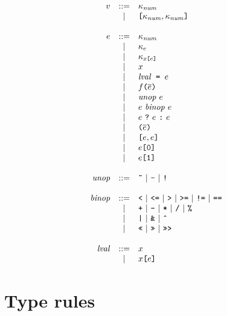 \documentclass{article}
\newcommand{\ternary}[3]{{#1}\ \mathjs{?}\ {#2}\ \mathjs{:}\ {#3}}
\newcommand{\funcall}[2]{{#1}\mathjs{(}{#2}\mathjs{)}}
\newcommand{\paren}[1]{\mathjs{(}{#1}\mathjs{)}}
\newcommand{\seq}[1]{\overline{{#1}}}
\newcommand{\mathjs}[1]{\mbox{\texttt{{#1}}}}
\newcommand{\mathjssm}[1]{\mbox{\texttt{\scriptsize {#1}}}}
\newcommand{\getprop}[2]{{#1}\mathjs{[}{#2}\mathjs{]}}
\newcommand{\getpropsm}[2]{{#1}\mathjssm{[}{#2}\mathjssm{]}}
\newcommand{\longlong}[2]{\mathjs{[}{#1},{#2}\mathjs{]}}
\begin{document}
\[
\begin{array}{rcl}
v & ::= & \kappa_{\mathit{num}} \\
  &  |  & \longlong{\kappa_{\mathit{num}}}{\kappa_{\mathit{num}}} \\
\\
e & ::= & \kappa_{\mathit{num}} \\
  &  |  & \kappa_e \\
  &  |  & \kappa_{\getpropsm{x}{e}} \\
  &  |  & x \\
  &  |  & \mathit{lval}\mathjs{ = }e \\
  &  |  & \funcall{f}{\seq{e}} \\
  &  |  & \mathit{unop}\ e \\
  &  |  & e\ \mathit{binop}\ e \\
  &  |  & \ternary{e}{e}{e} \\
  &  |  & \paren{\seq{e}} \\
  &  |  & \longlong{e}{e} \\
  &  |  & \getprop{e}{\mathjs{0}} \\
  &  |  & \getprop{e}{\mathjs{1}} \\
\\
\mathit{unop} & ::= & \mathjs{\~{}} ~|~ \mathjs{-} ~|~ \mathjs{!} \\
\\
\mathit{binop} & ::= & \mathjs{<} ~|~ \mathjs{<=} ~|~ \mathjs{>} ~|~ \mathjs{>=} ~|~ \mathjs{!=} ~|~ \mathjs{==} \\
               &  |  & \mathjs{+} ~|~ \mathjs{-} ~|~ \mathjs{*} ~|~ \mathjs{/} ~|~ \mathjs{\%} \\
               &  |  & \mathjs{|} ~|~ \mathjs{\&} ~|~ \mathjs{\^{}} \\
               &  |  & \mathjs{<<} ~|~ \mathjs{>>} ~|~ \mathjs{>>>} \\
\\
\mathit{lval} & ::= & x \\
              &  |  & \getprop{x}{e} \\
\end{array}
\]

\section{Type rules}
\end{document}
